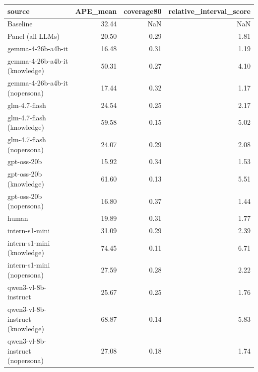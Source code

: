\begin{tabular}{lrrr}
\toprule
source & APE\_mean & coverage80 & relative\_interval\_score \\
\midrule
Baseline & 32.44 & NaN & NaN \\
Panel (all LLMs) & 20.50 & 0.29 & 1.81 \\
gemma-4-26b-a4b-it & 16.48 & 0.31 & 1.19 \\
gemma-4-26b-a4b-it (knowledge) & 50.31 & 0.27 & 4.10 \\
gemma-4-26b-a4b-it (nopersona) & 17.44 & 0.32 & 1.17 \\
glm-4.7-flash & 24.54 & 0.25 & 2.17 \\
glm-4.7-flash (knowledge) & 59.58 & 0.15 & 5.02 \\
glm-4.7-flash (nopersona) & 24.07 & 0.29 & 2.08 \\
gpt-oss-20b & 15.92 & 0.34 & 1.53 \\
gpt-oss-20b (knowledge) & 61.60 & 0.13 & 5.51 \\
gpt-oss-20b (nopersona) & 16.80 & 0.37 & 1.44 \\
human & 19.89 & 0.31 & 1.77 \\
intern-s1-mini & 31.09 & 0.29 & 2.39 \\
intern-s1-mini (knowledge) & 74.45 & 0.11 & 6.71 \\
intern-s1-mini (nopersona) & 27.59 & 0.28 & 2.22 \\
qwen3-vl-8b-instruct & 25.67 & 0.25 & 1.76 \\
qwen3-vl-8b-instruct (knowledge) & 68.87 & 0.14 & 5.83 \\
qwen3-vl-8b-instruct (nopersona) & 27.08 & 0.18 & 1.74 \\
\bottomrule
\end{tabular}
